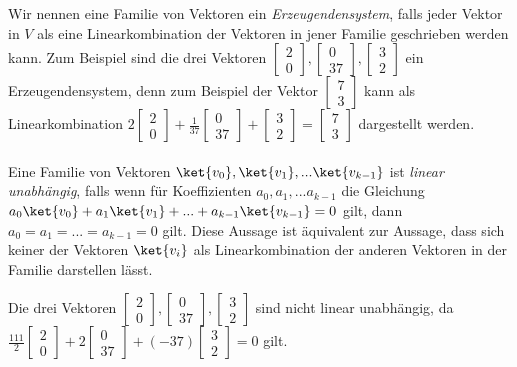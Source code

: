 Wir nennen eine Familie von Vektoren ein \textit{Erzeugendensystem}, falls jeder Vektor in $V$ als eine Linearkombination der Vektoren in jener Familie geschrieben werden kann. Zum Beispiel sind die drei Vektoren $\begin{bmatrix}2 \\ 0\end{bmatrix}, \begin{bmatrix} 0 \\ 37\end{bmatrix}, \begin{bmatrix}3 \\ 2\end{bmatrix}$ ein Erzeugendensystem, denn zum Beispiel der Vektor $\begin{bmatrix}7 \\ 3\end{bmatrix}$ kann als Linearkombination $2\begin{bmatrix}2 \\ 0\end{bmatrix} + \frac{1}{37}\begin{bmatrix} 0 \\ 37\end{bmatrix} + \begin{bmatrix}3 \\ 2\end{bmatrix} = \begin{bmatrix}7 \\ 3\end{bmatrix}$ dargestellt werden.
\paragraph{}
Eine Familie von Vektoren $\ket{v_0}, \ket{v_1}, ... \ket{v_{k - 1}}$ ist \textit{linear unabhängig}, falls wenn für Koeffizienten $a_0, a_1, ... a_{k - 1}$ die Gleichung $a_0\ket{v_0} + a_1\ket{v_1} + ... + a_{k - 1}\ket{v_{k - 1}} = 0$ gilt, dann $a_0 = a_1 = ... = a_{k - 1} = 0$ gilt. Diese Aussage ist äquivalent zur Aussage, dass sich keiner der Vektoren $\ket{v_{i}}$ als Linearkombination der anderen Vektoren in der Familie darstellen lässt.

Die drei Vektoren $\begin{bmatrix}2 \\ 0\end{bmatrix}, \begin{bmatrix} 0 \\ 37\end{bmatrix}, \begin{bmatrix}3 \\ 2\end{bmatrix}$ sind nicht linear unabhängig, da $\frac{111}{2}\begin{bmatrix}2 \\ 0\end{bmatrix} + 2\begin{bmatrix} 0 \\ 37\end{bmatrix} + (-37)\begin{bmatrix}3 \\ 2\end{bmatrix} = 0$ gilt.
